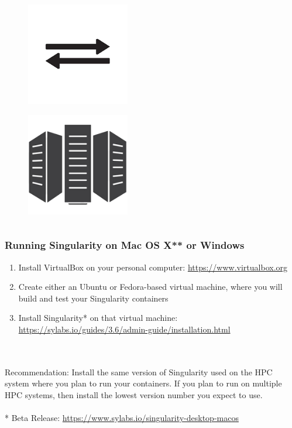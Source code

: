 \documentclass{beamer}
\begin{document}
\begin{frame}
\begin{columns}
\begin{column}{0.5\textwidth}
         \vspace{-3.0em}
         \begin{figure}[htbp]
            \includegraphics[width=0.4\textwidth]{images/file-transfer-arrows.png}
         \end{figure}
         \vspace{-3.0em}
         \begin{figure}[htbp]
            \includegraphics[width=0.4\textwidth]{images/supercomputer-icon.png}
         \end{figure}
      \end{column}
   \end{columns}
\end{frame}

\begin{frame}
   \frametitle{Running Singularity on Mac OS X** or Windows}
   \begin{enumerate}
      \setlength\itemsep{1.0em}
      \item Install VirtualBox on your personal computer: 
         \url{https://www.virtualbox.org}
      \item Create either an Ubuntu or Fedora-based virtual machine, 
         where you will build and test your Singularity containers
      \item Install Singularity* on that virtual machine: 
         \url{https://sylabs.io/guides/3.6/admin-guide/installation.html}
   \end{enumerate}
   \ \\ \ \\
   \footnotesize * Recommendation: Install the same version of 
      Singularity used on the HPC system where you plan to run your 
      containers. If you plan to run on multiple HPC systems, then 
      install the lowest version number you expect to use.
   \ \\ \ \\
   \footnotesize ** Beta Release: \url{https://www.sylabs.io/singularity-desktop-macos}

\end{frame}
\end{document}
